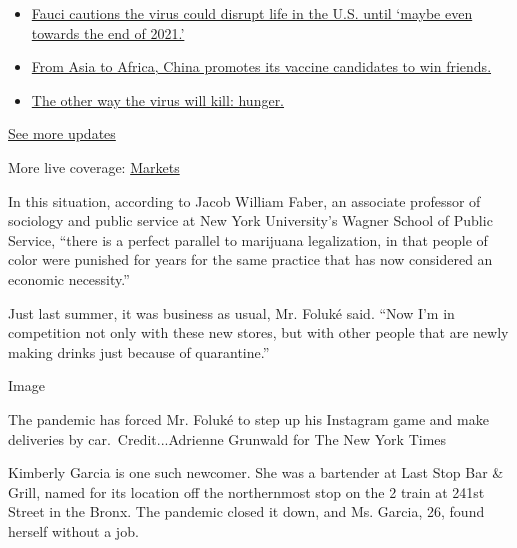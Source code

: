 \begin{itemize}
\tightlist
\item
  \href{https://www.nytimes3xbfgragh.onion/2020/09/11/world/covid-19-coronavirus.html?action=click\&pgtype=Article\&state=default\&region=MAIN_CONTENT_1\&context=storylines_live_updates\#link-dfb8a16}{Fauci
  cautions the virus could disrupt life in the U.S. until `maybe even
  towards the end of 2021.'}
\item
  \href{https://www.nytimes3xbfgragh.onion/2020/09/11/world/covid-19-coronavirus.html?action=click\&pgtype=Article\&state=default\&region=MAIN_CONTENT_1\&context=storylines_live_updates\#link-7104d154}{From
  Asia to Africa, China promotes its vaccine candidates to win friends.}
\item
  \href{https://www.nytimes3xbfgragh.onion/2020/09/11/world/covid-19-coronavirus.html?action=click\&pgtype=Article\&state=default\&region=MAIN_CONTENT_1\&context=storylines_live_updates\#link-393ad215}{The
  other way the virus will kill: hunger.}
\end{itemize}

\href{https://www.nytimes3xbfgragh.onion/2020/09/11/world/covid-19-coronavirus.html?action=click\&pgtype=Article\&state=default\&region=MAIN_CONTENT_1\&context=storylines_live_updates}{See
more updates}

More live coverage:
\href{https://www.nytimes3xbfgragh.onion/live/2020/09/11/business/stock-market-today-coronavirus?action=click\&pgtype=Article\&state=default\&region=MAIN_CONTENT_1\&context=storylines_live_updates}{Markets}

In this situation, according to Jacob William Faber, an associate
professor of sociology and public service at New York University's
Wagner School of Public Service, ``there is a perfect parallel to
marijuana legalization, in that people of color were punished for years
for the same practice that has now considered an economic necessity.''

Just last summer, it was business as usual, Mr. Foluké said. ``Now I'm
in competition not only with these new stores, but with other people
that are newly making drinks just because of quarantine.''

Image

The pandemic has forced Mr. Foluké to step up his Instagram game and
make deliveries by car.~Credit...Adrienne Grunwald for The New York
Times

Kimberly Garcia is one such newcomer. She was a bartender at Last Stop
Bar \& Grill, named for its location off the northernmost stop on the 2
train at 241st Street in the Bronx. The pandemic closed it down, and Ms.
Garcia, 26, found herself without a job.

